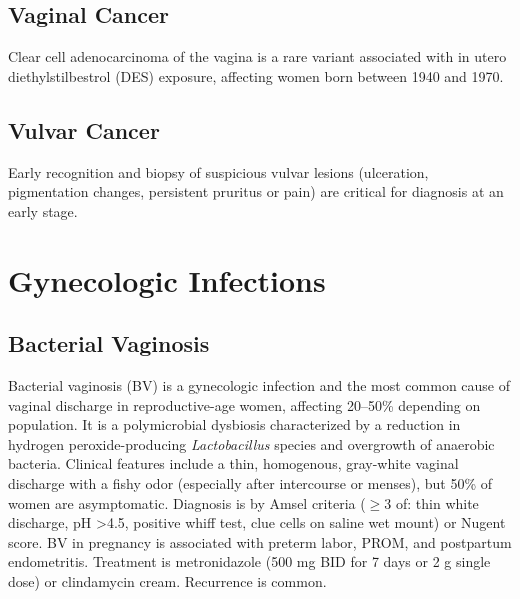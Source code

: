 \subsection{Vaginal Cancer}
\label{sec:obstetric:Vaginal Cancer}
Clear cell adenocarcinoma of the vagina is a rare variant associated with in utero diethylstilbestrol (DES) exposure, affecting women born between 1940 and 1970.

\subsection{Vulvar Cancer}
\label{sec:obstetric:Vulvar Cancer}
Early recognition and biopsy of suspicious vulvar lesions (ulceration, pigmentation changes, persistent pruritus or pain) are critical for diagnosis at an early stage.

\section{Gynecologic Infections}








\label{sec:Gynecologic Infections}

\subsection{Bacterial Vaginosis}
\label{sec:Bacterial Vaginosis}
Bacterial vaginosis (BV) is a gynecologic infection and the most common cause of vaginal discharge in reproductive-age women, affecting 20--50\% depending on population. It is a polymicrobial dysbiosis characterized by a reduction in hydrogen peroxide-producing \textit{Lactobacillus} species and overgrowth of anaerobic bacteria. Clinical features include a thin, homogenous, gray-white vaginal discharge with a fishy odor (especially after intercourse or menses), but 50\% of women are asymptomatic. Diagnosis is by Amsel criteria ($\ge$3 of: thin white discharge, pH >4.5, positive whiff test, clue cells on saline wet mount) or Nugent score. BV in pregnancy is associated with preterm labor, PROM, and postpartum endometritis. Treatment is metronidazole (500 mg BID for 7 days or 2 g single dose) or clindamycin cream. Recurrence is common.


